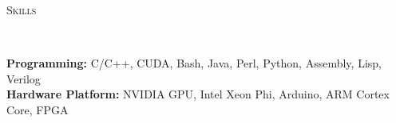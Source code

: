 \documentclass[a4paper, 12pt]{article}
\newenvironment{changemargin}[2]{%
  \begin{list}{}{%
      \setlength{\topsep}{0pt}%
      \setlength{\leftmargin}{#1}%
      \setlength{\rightmargin}{#2}%
      \setlength{\listparindent}{\parindent}%
      \setlength{\itemindent}{\parindent}%
      \setlength{\parsep}{\parskip}%
    }%
  \item[]}{\end{list}
}
\newcommand{\lineover}{
  \begin{changemargin}{-0.05in}{-0.05in}
    \vspace*{-8pt}
    \hrulefill \\
    \vspace*{-2pt}
  \end{changemargin}
}
\newcommand{\header}[1]{
  \begin{changemargin}{-0.6in}{-0.6in}
    \fontsize{15}{15}\scshape{#1}\\
    \lineover
    \vspace*{-4pt}
  \end{changemargin}
}
\newenvironment{body}
{
\vspace*{-16pt}
\begin{changemargin}{-0.25in}{-0.5in}
}
{
\end{changemargin}
}
\begin{document}
% 
%
%

\smallskip
\header{Skills}
\begin{body}
  \vspace{14pt}
  \textbf{Programming:}{} C/C++, CUDA, Bash, Java, Perl, Python, Assembly, Lisp, Verilog\\
  \medskip
  \textbf{Hardware Platform:}{} NVIDIA GPU, Intel Xeon Phi, Arduino, ARM Cortex Core, FPGA\\
\end{body}
\end{document}
